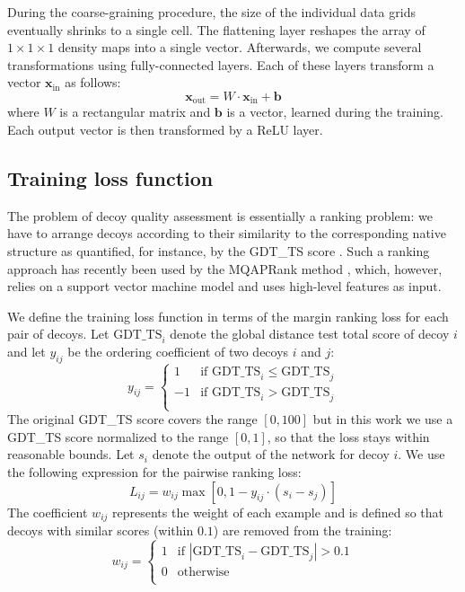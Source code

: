 \documentclass{bioinfo}
\begin{document}
During the coarse-graining procedure, the size of the individual data
grids eventually shrinks to a single cell. The flattening layer
reshapes the array of $1\times 1\times 1$ density maps into a single
vector. Afterwards, we compute several transformations using
fully-connected layers. Each of these layers transform a vector
$\mathbf{x}_\text{in}$ as follows:
\begin{equation}
\mathbf{x}_\text{out} = W \cdot \mathbf{x}_\text{in} + \mathbf{b}
\end{equation}
where $W$ is a rectangular matrix and $\mathbf{b}$ is a vector,
learned during the training. Each output vector is then transformed by
a ReLU layer.


\subsection{Training loss function}

The problem of decoy quality assessment is essentially a ranking
problem: we have to arrange decoys according to their similarity to
the corresponding native structure as quantified, for instance, by the
GDT\_TS score \citep{zemla2001casp4}. Such a ranking approach has
recently been used by the MQAPRank method \citep{jing2016sorting},
which, however, relies on a support vector machine model and uses
high-level features as input.

We define the training loss function in terms of
the margin ranking loss \citep{joachims2002optimizing, gong2013deep}
for each pair of decoys.  Let $\text{GDT\_TS}_i$ denote the global
distance test total score of decoy $i$ and let $y_{ij}$ be the
ordering coefficient of two decoys $i$ and $j$:
\begin{equation}
y_{ij} = \begin{cases}
               1& \text{if }\text{GDT\_TS}_i \leq \text{GDT\_TS}_j \\
               -1& \text{if }\text{GDT\_TS}_i > \text{GDT\_TS}_j \\
            \end{cases}
\end{equation}
The original GDT\_TS score covers the range $[0,100]$ but in this work
we use a GDT\_TS score normalized to the range $[0,1]$, so that the
loss stays within reasonable bounds.  Let $s_i$ denote the output of
the network for decoy $i$. We use the following expression for the
pairwise ranking loss:
\begin{equation}
L_{ij} = w_{ij} \max \left[ 0, 1 - y_{ij} \cdot (s_i - s_j) \right]
\end{equation}
The coefficient $w_{ij}$ represents the weight of each example and is
defined so that decoys with similar scores (within $0.1$) are removed
from the training:
\begin{equation}
w_{ij} = \begin{cases}
               1& \text{if } \left| \text{GDT\_TS}_i - \text{GDT\_TS}_j \right| > 0.1 \\
               0& \text{otherwise} \\ 
            \end{cases}
\end{equation}
\end{document}
